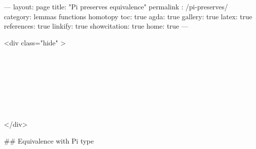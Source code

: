 ---
layout: page
title: "Pi preserves equivalence"
permalink : /pi-preserves/
category: lemmas functions homotopy
toc: true
agda: true
gallery: true
latex: true
references: true
linkify: true
showcitation: true
home: true
---

<div class="hide" >
\begin{code}%
\>[0]\AgdaSymbol{\{-\#}\AgdaSpace{}%
\AgdaSpace{}%
\AgdaSpace{}%
\AgdaSymbol{\#-\}}\<%
\\
\>[0]\AgdaSpace{}%
\AgdaSpace{}%
\<%
\\
\>[0]\AgdaSpace{}%
\AgdaSpace{}%
\<%
\\
%
\\[\AgdaEmptyExtraSkip]%
\>[0]\AgdaSpace{}%
\AgdaSpace{}%
\<%
\\
\>[0]\AgdaSpace{}%
\AgdaSpace{}%
\<%
\\
\>[0]\AgdaSpace{}%
\AgdaSpace{}%
\<%
\end{code}
</div>


## Equivalence with Pi type

